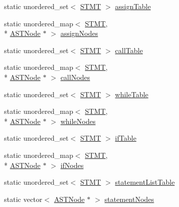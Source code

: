 \begin{DoxyCompactItemize}
\item 
static unordered\-\_\-set$<$ \hyperlink{std_afx_8h_a4a876b28ac3f59cecb39c2d2d76e4e7a}{S\-T\-M\-T} $>$ \hyperlink{class_p_k_b_a616513239f3fa6971424332dfabe0ead}{assign\-Table}
\item 
static unordered\-\_\-map$<$ \hyperlink{std_afx_8h_a4a876b28ac3f59cecb39c2d2d76e4e7a}{S\-T\-M\-T}, \\*
\hyperlink{class_a_s_t_node}{A\-S\-T\-Node} $\ast$ $>$ \hyperlink{class_p_k_b_a4bed7a639eeaebec0f877429f1b73079}{assign\-Nodes}
\item 
static unordered\-\_\-set$<$ \hyperlink{std_afx_8h_a4a876b28ac3f59cecb39c2d2d76e4e7a}{S\-T\-M\-T} $>$ \hyperlink{class_p_k_b_a4df9c934e4846c58863ed3513a1ff34a}{call\-Table}
\item 
static unordered\-\_\-map$<$ \hyperlink{std_afx_8h_a4a876b28ac3f59cecb39c2d2d76e4e7a}{S\-T\-M\-T}, \\*
\hyperlink{class_a_s_t_node}{A\-S\-T\-Node} $\ast$ $>$ \hyperlink{class_p_k_b_a54cdb3a6553fd54b689a812d3187ccce}{call\-Nodes}
\item 
static unordered\-\_\-set$<$ \hyperlink{std_afx_8h_a4a876b28ac3f59cecb39c2d2d76e4e7a}{S\-T\-M\-T} $>$ \hyperlink{class_p_k_b_ac2d6057e757e3f104e38866f8b6a16e9}{while\-Table}
\item 
static unordered\-\_\-map$<$ \hyperlink{std_afx_8h_a4a876b28ac3f59cecb39c2d2d76e4e7a}{S\-T\-M\-T}, \\*
\hyperlink{class_a_s_t_node}{A\-S\-T\-Node} $\ast$ $>$ \hyperlink{class_p_k_b_a4be6809486f222460f02b45261602dc7}{while\-Nodes}
\item 
static unordered\-\_\-set$<$ \hyperlink{std_afx_8h_a4a876b28ac3f59cecb39c2d2d76e4e7a}{S\-T\-M\-T} $>$ \hyperlink{class_p_k_b_a151454c4bd06a6a0df1905cb21634f13}{if\-Table}
\item 
static unordered\-\_\-map$<$ \hyperlink{std_afx_8h_a4a876b28ac3f59cecb39c2d2d76e4e7a}{S\-T\-M\-T}, \\*
\hyperlink{class_a_s_t_node}{A\-S\-T\-Node} $\ast$ $>$ \hyperlink{class_p_k_b_abc04a09157ed8733ea6ce207af0a837d}{if\-Nodes}
\item 
static unordered\-\_\-set$<$ \hyperlink{std_afx_8h_a4a876b28ac3f59cecb39c2d2d76e4e7a}{S\-T\-M\-T} $>$ \hyperlink{class_p_k_b_adc4120ed1f3472e49ba743fdb5a7f57e}{statement\-List\-Table}
\item 
static vector$<$ \hyperlink{class_a_s_t_node}{A\-S\-T\-Node} $\ast$ $>$ \hyperlink{class_p_k_b_a04aa565187bc3a566ac0163027e46f46}{statement\-Nodes}
\item 

\end{DoxyCompactItemize}
